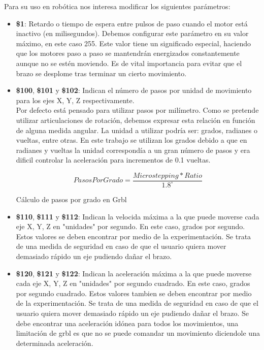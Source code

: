 Para su uso en robótica nos interesa modificar los siguientes parámetros: 
\begin{itemize}
\item \textbf{\$1}: Retardo o tiempo de espera entre pulsos de paso cuando el motor está inactivo (en milisegundos). Debemos configurar 
este parámetro en su valor máximo, en este caso 255. Este valor tiene un significado especial, haciendo que los motores paso a paso 
se mantendrán energizados constantemente aunque no se estén moviendo. Es de vital importancia para evitar que el brazo se desplome tras terminar un cierto movimiento.  
\item \textbf{\$100}, \textbf{\$101} y \textbf{\$102}: Indican el número de pasos por unidad de movimiento para los ejes X, Y, Z respectivamente. 
\\Por defecto está pensado para utilizar pasos por milímetro. Como se pretende utilizar articulaciones de rotación, debemos expresar esta relación 
en función de alguna medida angular. La unidad a utilizar podría ser: grados, radianes o vueltas, entre otras. En este trabajo se 
utilizan los grados debido a que en radianes y vueltas la unidad correspondía a un gran número de pasos y era dificil controlar la aceleración para incrementos de 
0.1 vueltas. 

\begin{myequation}[h!]
\begin{equation}
    PasosPorGrado = \frac{Microstepping * Ratio}{1.8^\circ}
\nonumber
\label{ec:pasos_por_grado}
\end{equation}
\caption[Cálculo de pasos por grado en Grbl]{Cálculo de pasos por grado en Grbl}
\end{myequation} 

\item \textbf{\$110}, \textbf{\$111} y \textbf{\$112}: Indican la velocida máxima a la que puede moverse cada eje X, Y, Z en "unidades" por segundo. 
En este caso, grados por segundo. Estos valores se deben encontrar por medio de la experimentación. Se trata de una medida de seguridad en 
caso de que el usuario quiera mover demasiado rápido un eje pudiendo dañar el brazo.

\item \textbf{\$120}, \textbf{\$121} y \textbf{\$122}: Indican la aceleración máxima a la que puede moverse cada eje X, Y, Z en "unidades" por segundo cuadrado. 
En este caso, grados por segundo cuadrado. Estos valores tambien se deben encontrar por medio de la experimentación. Se trata de una medida de seguridad en 
caso de que el usuario quiera mover demasiado rápido un eje pudiendo dañar el brazo. Se debe encontrar una aceleración idónea para todos 
los movimientos, una limitación de grbl es que no se puede comandar un movimiento diciendole una determinada aceleración.

\end{itemize}

